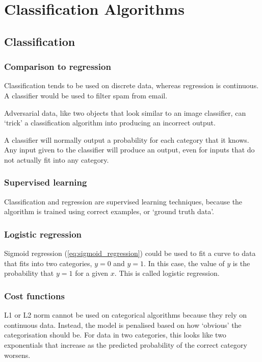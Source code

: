 \chapter{Classification Algorithms}

\section{Classification}
\subsection{Comparison to regression}
Classification tends to be used on discrete data, whereas regression is continuous. A classifier would be used to filter spam from email.

Adversarial data, like two objects that look similar to an image classifier, can `trick' a classification algorithm into producing an incorrect output.

A classifier will normally output a probability for each category that it knows. Any input given to the classifier will produce an output, even for inputs that do not actually fit into any category.

\subsection{Supervised learning}
Classification and regression are supervised learning techniques, because the algorithm is trained using correct examples, or `ground truth data'.

\subsection{Logistic regression}
Sigmoid regression (\cref{eq:sigmoid_regression}) could be used to fit a curve to data that fits into two categories, \(y=0\) and \(y=1\). In this case, the value of \(y\) is the probability that \(y=1\) for a given \(x\). This is called logistic regression.

\subsection{Cost functions}
L1 or L2 norm cannot be used on categorical algorithms because they rely on continuous data. Instead, the model is penalised based on how `obvious' the categorisation should be. For data in two categories, this looks like two exponentials that increase as the predicted probability of the correct category worsens.

